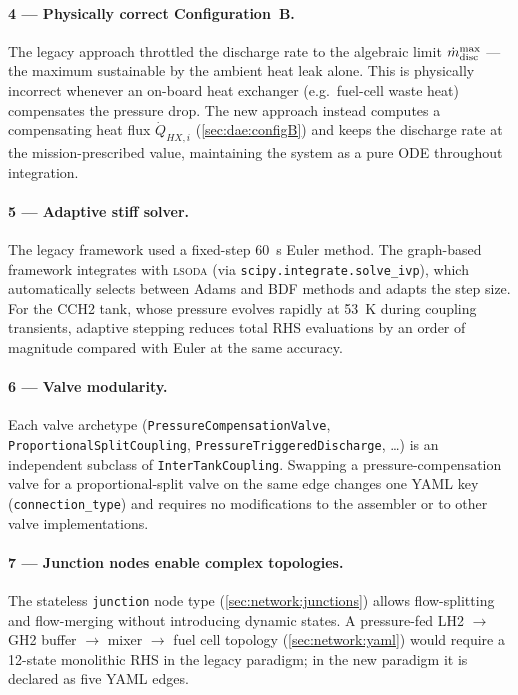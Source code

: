 \paragraph{4 --- Physically correct Configuration~B.}
The legacy approach throttled the discharge rate to the algebraic limit
$\dot{m}_\text{disc}^{\max}$ --- the maximum sustainable by the ambient heat leak
alone.  This is physically incorrect whenever an on-board heat exchanger (e.g.\
fuel-cell waste heat) compensates the pressure drop.  The new approach instead
computes a compensating heat flux $\dot{Q}_{HX,i}$ (\cref{sec:dae:configB})
and keeps the discharge rate at the mission-prescribed value, maintaining the
system as a pure ODE throughout integration.

\paragraph{5 --- Adaptive stiff solver.}
The legacy framework used a fixed-step \SI{60}{\second} Euler method.  The
graph-based framework integrates with \textsc{lsoda} (via
\texttt{scipy.integrate.solve\_ivp}), which automatically selects between Adams
and BDF methods and adapts the step size.  For the CCH2 tank, whose pressure
evolves rapidly at \SI{53}{\kelvin} during coupling transients,
adaptive stepping reduces total RHS evaluations by an order of magnitude
compared with Euler at the same accuracy.

\paragraph{6 --- Valve modularity.}
Each valve archetype (\texttt{PressureCompensationValve},
\texttt{ProportionalSplitCoupling}, \texttt{PressureTriggeredDischarge}, \dots)
is an independent subclass of \texttt{InterTankCoupling}.  Swapping a
pressure-compensation valve for a proportional-split valve on the same edge
changes one YAML key (\texttt{connection\_type}) and requires no modifications
to the assembler or to other valve implementations.

\paragraph{7 --- Junction nodes enable complex topologies.}
The stateless \texttt{junction} node type (\cref{sec:network:junctions}) allows
flow-splitting and flow-merging without introducing dynamic states.  A
pressure-fed LH2 $\to$ GH2 buffer $\to$ mixer $\to$ fuel cell topology
(\cref{sec:network:yaml}) would require a 12-state monolithic RHS in the legacy
paradigm; in the new paradigm it is declared as five YAML edges.

